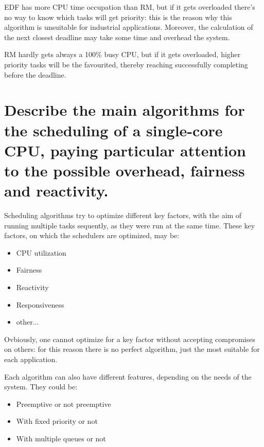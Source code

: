 EDF has more CPU time occupation than RM, but if it gets overloaded there's no way to know which tasks will get priority: this is the reason why this algorithm is unsuitable for industrial applications. Moreover, the calculation of the next closest deadline may take some time and overhead the system.

RM hardly gets always a 100\% busy CPU, but if it gets overloaded, higher priority tasks will be the favourited, thereby reaching successfully completing before the deadline.

\section{Describe the main algorithms for the scheduling of a single-core CPU, paying particular attention to the possible overhead, fairness and reactivity.}

Scheduling algorithms try to optimize different key factors, with the aim of running multiple tasks sequently, as they were run at the same time.
These key factors, on which the schedulers are optimized, may be:
\begin{itemize}
	\item CPU utilization
	\item Fairness
	\item Reactivity
	\item Responsiveness
	\item other...
\end{itemize}

Ovbiously, one cannot optimize for a key factor without accepting compromises on others: for this reason there is no perfect algorithm, just the most suitable for each application.

Each algorithm can also have different features, depending on the needs of the system. They could be:
\begin{itemize}
	\item Preemptive or not preemptive
	\item With fixed priority or not
	\item With multiple queues or not
\end{itemize}

